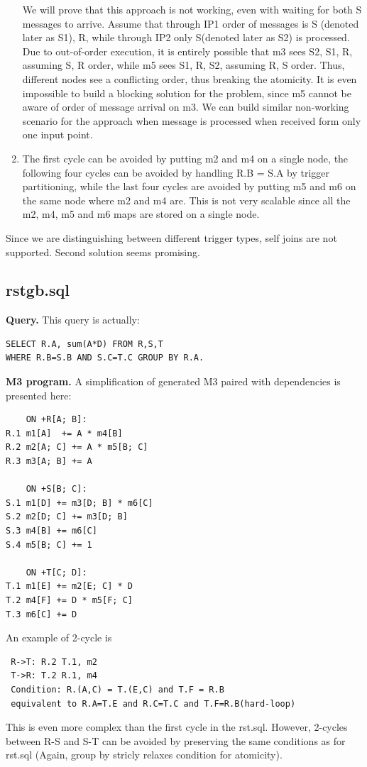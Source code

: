 \documentclass{sig-semester}
\begin{document}
\begin{enumerate}
We will prove that this approach is not working, even with waiting for both S messages to arrive. Assume that through IP1 order of messages is S (denoted later as S1), R, while through IP2 only S(denoted later as S2) is processed. Due to out-of-order execution, it is entirely possible that m3 sees S2, S1, R, assuming S, R order, while m5 sees S1, R, S2, assuming R, S order. Thus, different nodes see a conflicting order, thus breaking the atomicity. It is even impossible to build a blocking solution for the problem, since m5 cannot be aware of order of message arrival on m3. We can build similar non-working scenario for the approach when message is processed when received form only one input point.

\item The first cycle can be avoided by putting m2 and m4 on a single node, the following four cycles can be avoided by handling R.B = S.A by trigger partitioning, while the last four cycles are avoided by putting m5 and m6 on the same node where m2 and m4 are. This is not very scalable since all the m2, m4, m5 and m6 maps are stored on a single node.
\end{enumerate}

Since we are distinguishing between different trigger types, self joins are not supported. Second solution seems promising.

\subsection{rstgb.sql}
\textbf{Query.} This query is actually:
\begin{verbatim}
SELECT R.A, sum(A*D) FROM R,S,T 
WHERE R.B=S.B AND S.C=T.C GROUP BY R.A.
\end{verbatim}

\textbf{M3 program.} A simplification of generated M3 paired with dependencies is presented here:
\begin{verbatim}
    ON +R[A; B]: 
R.1 m1[A]  += A * m4[B]
R.2 m2[A; C] += A * m5[B; C]
R.3 m3[A; B] += A

    ON +S[B; C]: 
S.1 m1[D] += m3[D; B] * m6[C]
S.2 m2[D; C] += m3[D; B]
S.3 m4[B] += m6[C]
S.4 m5[B; C] += 1

    ON +T[C; D]: 
T.1 m1[E] += m2[E; C] * D
T.2 m4[F] += D * m5[F; C]
T.3 m6[C] += D
\end{verbatim}

An example of 2-cycle is
\begin{verbatim}
 R->T: R.2 T.1, m2
 T->R: T.2 R.1, m4
 Condition: R.(A,C) = T.(E,C) and T.F = R.B
 equivalent to R.A=T.E and R.C=T.C and T.F=R.B(hard-loop)
\end{verbatim}
This is even more complex than the first cycle in the rst.sql. However, 2-cycles between R-S and S-T can be avoided by preserving the same conditions as for rst.sql (Again, group by stricly relaxes condition for atomicity).
\end{document}
